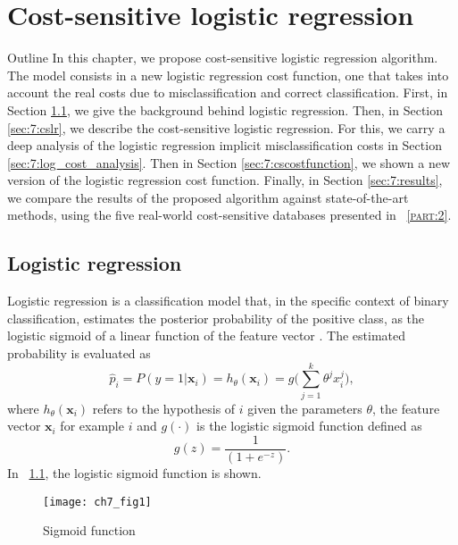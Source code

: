 \chapter{Cost-sensitive logistic regression}\label{ch:7}

\begin{remark}{Outline}
In this chapter, we propose cost-sensitive logistic regression algorithm. The model consists in 
a new logistic regression cost function, one that takes into account the real costs due to 
misclassification and correct classification. First, in Section \ref{sec:7:logistic}, we give the 
background behind logistic regression. Then, in Section \ref{sec:7:cslr}, we describe the 
cost-sensitive logistic regression. For this, we carry a deep analysis of the 
logistic regression implicit misclassification costs in Section \ref{sec:7:log_cost_analysis}. Then 
in Section \ref{sec:7:cscostfunction}, we shown a new version of the logistic regression cost 
function. 
Finally, in Section \ref{sec:7:results}, we compare the results of the proposed 
algorithm against state-of-the-art methods, using the five real-world cost-sensitive databases 
presented in \partname{~\textsc{\ref{part:2}}}.
\end{remark}


\section{Logistic regression}
\label{sec:7:logistic}

Logistic regression is a classification model that, in the specific context of binary 
classification, estimates the posterior probability of the positive class, as the logistic sigmoid 
of a linear function of the feature vector \citep{Bishop2006}. The estimated probability  is 
evaluated as 
\begin{equation}
  \hat p_i = P(y=1 \vert \mathbf{x}_i) = h_{\theta}(\mathbf{x}_i) = 
  g\bigg(\sum_{j=1}^{k}{\theta^jx_i^j}\bigg),
\end{equation}
where $h_\theta(\mathbf{x}_i)$ refers to the hypothesis of $i$ given the parameters $\theta$, the 
feature vector $\mathbf{x}_i$ for example $i$ and  $g(\cdot)$ is the logistic sigmoid function 
defined as
\begin{equation}
  g(z)=\frac{1}{(1+e^{-z})} .
\end{equation}
In \figurename{~\ref{fig:ch7:1}}, the logistic sigmoid function is shown.
\begin{figure}[htbp]
  \centering
  \texttt{[image: ch7\_fig1]}
  \caption{Sigmoid function}
  \label{fig:ch7:1}
\end{figure}

